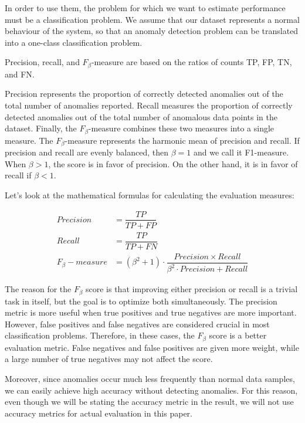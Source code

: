 In order to use them, the problem for which we want to estimate performance must be a classification problem. We assume that our dataset represents a normal behaviour of the system, so that an anomaly detection problem can be translated into a one-class classification problem. 

Precision, recall, and $F_{\beta}$-measure are based on the ratios of counts TP, FP, TN, and FN. 

Precision represents the proportion of correctly detected anomalies out of the total number of anomalies reported. Recall measures the proportion of correctly detected anomalies out of the total number of anomalous data points in the dataset. Finally, the $F_{\beta}$-measure combines these two measures into a single measure. The $F_{\beta}$-measure represents the harmonic mean of precision and recall. If precision and recall are evenly balanced, then $\beta = 1$ and we call it F1-measure. When $\beta > 1$, the score is in favor of precision. On the other hand, it is in favor of recall if $\beta < 1$. 

Let's look at the mathematical formulas for calculating the evaluation measures:

\begin{align}
    Precision &= \dfrac{TP}{TP + FP} \\
    Recall &= \dfrac{TP}{TP + FN} \\
    F_{\beta}-measure &= (\beta^2 + 1) \cdot \dfrac{Precision \times Recall}{\beta^2 \cdot Precision + Recall} 
\end{align}

The reason for the $F_{\beta}$ score is that improving either precision or recall is a trivial task in itself, but the goal is to optimize both simultaneously. The precision metric is more useful when true positives and true negatives are more important. However, false positives and false negatives are considered crucial in most classification problems. Therefore, in these cases, the $F_{\beta}$ score is a better evaluation metric. False negatives and false positives are given more weight, while a large number of true negatives may not affect the score.

Moreover, since anomalies occur much less frequently than normal data samples, we can easily achieve high accuracy without detecting anomalies. For this reason, even though we will be stating the accuracy metric in the result, we will not use accuracy metrics for actual evaluation in this paper.

